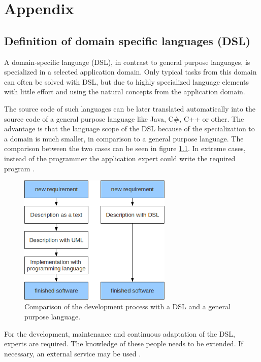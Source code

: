 \appendix
\chapter{Appendix}
\section{Definition of domain specific languages (DSL)}
\par
A domain-specific language (DSL), in contrast to general purpose languages, is specialized in a selected application domain. Only typical tasks from this domain can often be solved with DSL, but due to highly specialized language elements with little effort and using the natural concepts from the application domain.
\par
The source code of such languages can be later translated automatically into the source code of a general purpose language like Java, C\#, C++ or other. The advantage is that the language scope of the DSL because of the specialization to a domain is much smaller, in comparison to a general purpose language. The comparison between the two cases can be seen in figure \ref{fig:dsl}. In extreme cases, instead of the programmer the application expert could write the required program \autocite{appendix:dsl}.
\begin{figure}[h]
	\centering
	\includegraphics[width=0.65\textwidth]{pics/appendix/dsl.png}
	\caption{Comparison of the development process with a DSL and a general purpose language.  \label{fig:dsl}}	
\end{figure}
\par
For the development, maintenance and continuous adaptation of the DSL, experts are required. The knowledge of these people needs to be extended. If necessary, an external service may be used \autocite{appendix:dsl}. 



